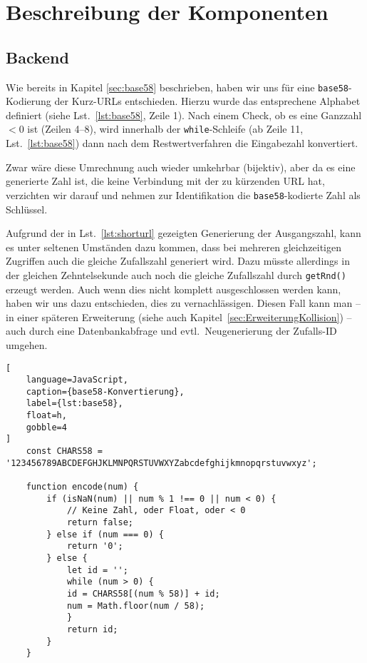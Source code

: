 \documentclass[a4paper,11pt,DIV=12,overfullrule=on]{scrreprt}%
\begin{document}
\section{Beschreibung der Komponenten}
\subsection{Backend}
Wie bereits in Kapitel \ref{sec:base58} beschrieben, haben wir uns für eine \texttt{base58}-Kodierung der Kurz-\ac{URL}s entschieden. Hierzu wurde das entsprechene Alphabet definiert (siehe Lst.~\ref{lst:base58}, Zeile 1). Nach einem Check, ob es eine Ganzzahl $< 0$ ist (Zeilen 4–8), wird innerhalb der \texttt{while}-Schleife (ab Zeile 11, Lst.~\ref{lst:base58}) dann nach dem Restwertverfahren die Eingabezahl konvertiert.

Zwar wäre diese Umrechnung auch wieder umkehrbar (bijektiv), aber da es eine generierte Zahl ist, die keine Verbindung mit der zu kürzenden \ac{URL} hat, verzichten wir darauf und nehmen zur Identifikation die \texttt{base58}-kodierte Zahl als Schlüssel.

Aufgrund der in Lst.~\ref{lst:shorturl} gezeigten Generierung der Ausgangszahl, kann es unter seltenen Umständen dazu kommen, dass bei mehreren gleichzeitigen Zugriffen auch die gleiche Zufallszahl generiert wird. Dazu müsste allerdings in der gleichen Zehntelsekunde auch noch die gleiche Zufallszahl durch \texttt{getRnd()} erzeugt werden. Auch wenn dies nicht komplett ausgeschlossen werden kann, haben wir uns dazu entschieden, dies zu vernachlässigen. Diesen Fall kann man – in einer späteren Erweiterung (siehe auch Kapitel~\ref{sec:ErweiterungKollision}) – auch durch eine Datenbankabfrage und evtl.\ Neugenerierung der Zufalls-ID umgehen.

\begin{lstlisting}[
    language=JavaScript,
    caption={base58-Konvertierung},
    label={lst:base58},
    float=h,
    gobble=4
]
    const CHARS58 = '123456789ABCDEFGHJKLMNPQRSTUVWXYZabcdefghijkmnopqrstuvwxyz';

    function encode(num) {
        if (isNaN(num) || num % 1 !== 0 || num < 0) {
            // Keine Zahl, oder Float, oder < 0
            return false;
        } else if (num === 0) {
            return '0';
        } else {
            let id = '';
            while (num > 0) {
            id = CHARS58[(num % 58)] + id;
            num = Math.floor(num / 58);
            }
            return id;
        }
    }
\end{lstlisting}
\end{document}
